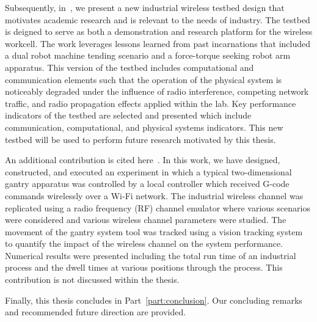 Subsequently, in~\cite{Candell.PLMConf2020}, we present a new industrial wireless testbed design that motivates academic research and is relevant to the needs of industry. The testbed is deigned to serve as both a demonstration and research platform for the wireless workcell. The work leverages lessons learned from past incarnations that included a dual robot machine tending scenario and a force-torque seeking robot arm apparatus. This version of the testbed includes computational and communication elements such that the operation of the physical system is noticeably degraded under the influence of radio interference, competing network traffic, and radio propagation effects applied within the lab. Key performance indicators of the testbed are selected and presented which include communication, computational, and physical systems indicators. This new testbed will be used to perform future research motivated by this thesis.

An additional contribution is cited here~\cite{MSEC2019-2896}.  In this work, we have designed, constructed, and executed an experiment in which a typical two-dimensional gantry apparatus was controlled by a local controller which received G-code commands wirelessly over a Wi-Fi network. The industrial wireless channel was replicated using a radio frequency (RF) channel emulator where various scenarios were considered and various wireless channel parameters were studied. The movement of the gantry system tool was tracked using a vision tracking system to quantify the impact of the wireless channel on the system performance. Numerical results were presented including the total run time of an industrial process and the dwell times at various positions through the process. This contribution is not discussed within the thesis.

Finally, this thesis concludes in Part~\ref{part:conclusion}.  Our concluding remarks and recommended future direction are provided.



